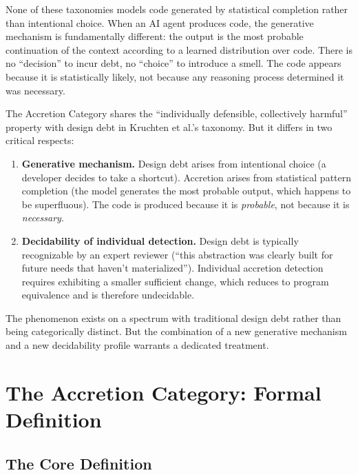 \documentclass[11pt, a4paper, logo, copyright]{googledeepmind}
\begin{document}
None of these taxonomies models code generated by statistical completion rather than intentional choice. When an AI agent produces code, the generative mechanism is fundamentally different: the output is the most probable continuation of the context according to a learned distribution over code. There is no ``decision'' to incur debt, no ``choice'' to introduce a smell. The code appears because it is statistically likely, not because any reasoning process determined it was necessary.

The Accretion Category shares the ``individually defensible, collectively harmful'' property with design debt in Kruchten et al.'s taxonomy. But it differs in two critical respects:

\begin{enumerate}[nosep]
    \item \textbf{Generative mechanism.} Design debt arises from intentional choice (a developer decides to take a shortcut). Accretion arises from statistical pattern completion (the model generates the most probable output, which happens to be superfluous). The code is produced because it is \emph{probable}, not because it is \emph{necessary}.
    \item \textbf{Decidability of individual detection.} Design debt is typically recognizable by an expert reviewer (``this abstraction was clearly built for future needs that haven't materialized''). Individual accretion detection requires exhibiting a smaller sufficient change, which reduces to program equivalence and is therefore undecidable.
\end{enumerate}

The phenomenon exists on a spectrum with traditional design debt rather than being categorically distinct. But the combination of a new generative mechanism and a new decidability profile warrants a dedicated treatment.


\section{The Accretion Category: Formal Definition}
\label{sec:formal}

\subsection{The Core Definition}
\end{document}
